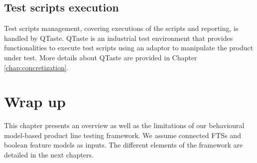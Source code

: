 \subsection{Test scripts execution}

Test scripts management, covering executions of the scripts and reporting, is handled by \gls{QTaste}. \gls{QTaste} is an industrial test environment that provides functionalities to execute test scripts using an adaptor to manipulate the product under test. More details about \gls{QTaste} are provided in Chapter \ref{chap:concretization}.


\section{Wrap up}

This chapter presents an overview as well as the limitations of our behavioural model-based product line testing framework. We assume connected \glspl{FTS} and boolean \glspl{feature model} as inputs. The different elements of the framework are detailed in the next chapters.
